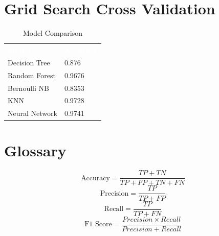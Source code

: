 \documentclass{assignmeownt}
\begin{document}
\section{Grid Search Cross Validation}
\begin{table}[htbp]
    \centering
    \begin{tabular}{ll}
        \rowcolor{blue}
        \textbf{\textcolor{white}{Model}} & \textbf{\textcolor{white}{Accuracy}} \\
        Decision Tree                     & 0.876                                \\
        Random Forest                     & 0.9676                               \\
        Bernoulli NB                      & 0.8353                               \\
        KNN                               & 0.9728                               \\
        Neural Network                    & 0.9741                               \\
    \end{tabular}
    \caption{Model Comparison}
    \label{tab:model_comparison}
\end{table}

\section{Glossary}
$$\text{Accuracy} = \frac{TP+TN}{TP+FP+TN+FN}$$
$$\text{Precision} = \frac{TP}{TP+FP}$$
$$\text{Recall} = \frac{TP}{TP+FN}$$
$$\text{F1 Score} = \frac{Precision\times Recall}{Precision+Recall}$$

\end{document}
